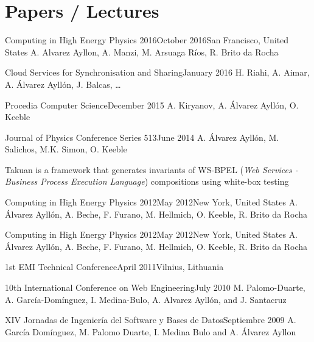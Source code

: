\newpage
\section{Papers / Lectures}
{Computing in High Energy Physics 2016}{October 2016}{San Francisco, United States}
{A. Alvarez Ayllon, A. Manzi, M. Arsuaga Ríos, R. Brito da Rocha}

{Cloud Services for Synchronisation and Sharing}{January 2016}{}
{H. Riahi, A. Aimar, A. Álvarez Ayllón, J. Balcas, \ldots}

{Procedia Computer Science}{December 2015}{}
{A. Kiryanov, A. Álvarez Ayllón, O. Keeble}

{Journal of Physics Conference Series 513}{June 2014}{}
{A. Álvarez Ayllón, M. Salichos, M.K. Simon, O. Keeble}

	{Takuan is a framework that generates invariants of WS-BPEL (\textit{Web Services - Business Process Execution Language}) compositions using white-box testing}
  {}{}

{Computing in High Energy Physics 2012}{May 2012}{New York, United States}
{A. Álvarez Ayllón, A. Beche, F. Furano, M. Hellmich, O. Keeble, R. Brito da Rocha}

{Computing in High Energy Physics 2012}{May 2012}{New York, United States}
{A. Álvarez Ayllón, A. Beche, F. Furano, M. Hellmich, O. Keeble, R. Brito da Rocha}

{1st EMI Technical Conference}{April 2011}{Vilnius, Lithuania}
{}{}

{10th International Conference on Web Engineering}{July 2010}{}
{M. Palomo-Duarte, A. García-Domínguez, I. Medina-Bulo, A. Alvarez Ayllón, and J. Santacruz}

{XIV Jornadas de Ingeniería del Software y Bases de Datos}{Septiembre 2009}{}
{A. García Domínguez, M. Palomo Duarte, I. Medina Bulo and A. Álvarez Ayllon}

